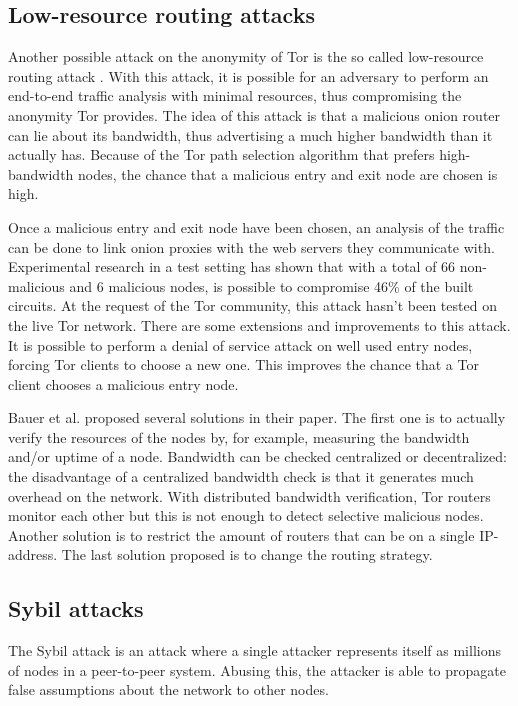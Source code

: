 \documentclass[12pt,journal,compsoc]{IEEEtran}
\begin{document}
	\subsection{Low-resource routing attacks}
		Another possible attack on the anonymity of Tor is the so called low-resource routing attack \cite{bauer2007low}. With this attack, it is possible for an adversary to perform an end-to-end traffic analysis with minimal resources, thus compromising the anonymity Tor provides. The idea of this attack is that a malicious onion router can lie about its bandwidth, thus advertising a much higher bandwidth than it actually has. Because of the Tor path selection algorithm that prefers high-bandwidth nodes, the chance that a malicious entry and exit node are chosen is high.

		Once a malicious entry and exit node have been chosen, an analysis of the traffic can be done to link onion proxies with the web servers they communicate with. Experimental research in a test setting has shown that with a total of 66 non-malicious and 6 malicious nodes, is possible to compromise 46\% of the built circuits. At the request of the Tor community, this attack hasn't been tested on the live Tor network. There are some extensions and improvements to this attack. It is possible to perform a denial of service attack on well used entry nodes, forcing Tor clients to choose a new one. This improves the chance that a Tor client chooses a malicious entry node. 

		Bauer et al. proposed several solutions in their paper. The first one is to actually verify the resources of the nodes by, for example, measuring the bandwidth and/or uptime of a node. Bandwidth can be checked centralized or decentralized: the disadvantage of a centralized bandwidth check is that it generates much overhead on the network. With distributed bandwidth verification, Tor routers monitor each other but this is not enough to detect selective malicious nodes. Another solution is to restrict the amount of routers that can be on a single IP-address. The last solution proposed is to change the routing strategy.	
		
	\subsection{Sybil attacks}
		The Sybil attack is an attack where a single attacker represents itself as millions of nodes in a peer-to-peer system. Abusing this, the attacker is able to propagate false assumptions about the network to other nodes.
		
\end{document}
